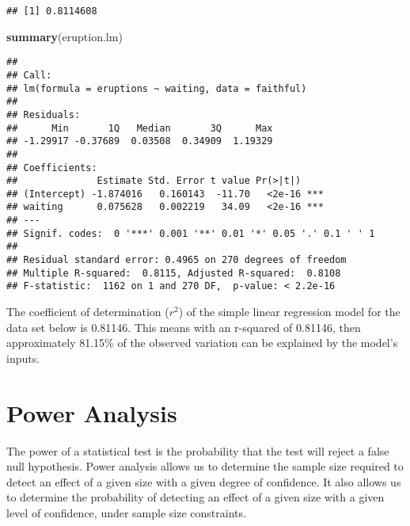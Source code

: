 \documentclass[
]{article}
\newenvironment{Shaded}{\begin{snugshade}}{\end{snugshade}}
\newcommand{\DataTypeTok}[1]{\textcolor[rgb]{0.13,0.29,0.53}{#1}}
\newcommand{\KeywordTok}[1]{\textcolor[rgb]{0.13,0.29,0.53}{\textbf{#1}}}
\newcommand{\NormalTok}[1]{#1}
\newcommand{\OperatorTok}[1]{\textcolor[rgb]{0.81,0.36,0.00}{\textbf{#1}}}
\newcommand{\StringTok}[1]{\textcolor[rgb]{0.31,0.60,0.02}{#1}}
\begin{document}
\begin{Shaded}
\end{Shaded}

\begin{verbatim}
## [1] 0.8114608
\end{verbatim}

\begin{Shaded}
\begin{Highlighting}[]
\KeywordTok{summary}\NormalTok{(eruption.lm)}
\end{Highlighting}
\end{Shaded}

\begin{verbatim}
## 
## Call:
## lm(formula = eruptions ~ waiting, data = faithful)
## 
## Residuals:
##      Min       1Q   Median       3Q      Max 
## -1.29917 -0.37689  0.03508  0.34909  1.19329 
## 
## Coefficients:
##              Estimate Std. Error t value Pr(>|t|)    
## (Intercept) -1.874016   0.160143  -11.70   <2e-16 ***
## waiting      0.075628   0.002219   34.09   <2e-16 ***
## ---
## Signif. codes:  0 '***' 0.001 '**' 0.01 '*' 0.05 '.' 0.1 ' ' 1
## 
## Residual standard error: 0.4965 on 270 degrees of freedom
## Multiple R-squared:  0.8115, Adjusted R-squared:  0.8108 
## F-statistic:  1162 on 1 and 270 DF,  p-value: < 2.2e-16
\end{verbatim}

The coefficient of determination (\(r^2\)) of the simple linear
regression model for the data set below is 0.81146. This means with an
r-squared of 0.81146, then approximately 81.15\% of the observed
variation can be explained by the model's inputs.

\hypertarget{power-analysis}{%
\section{Power Analysis}\label{power-analysis}}

The power of a statistical test is the probability that the test will
reject a false null hypothesis. Power analysis allows us to determine
the sample size required to detect an effect of a given size with a
given degree of confidence. It also allows us to determine the
probability of detecting an effect of a given size with a given level of
confidence, under sample size constraints.
\end{document}
